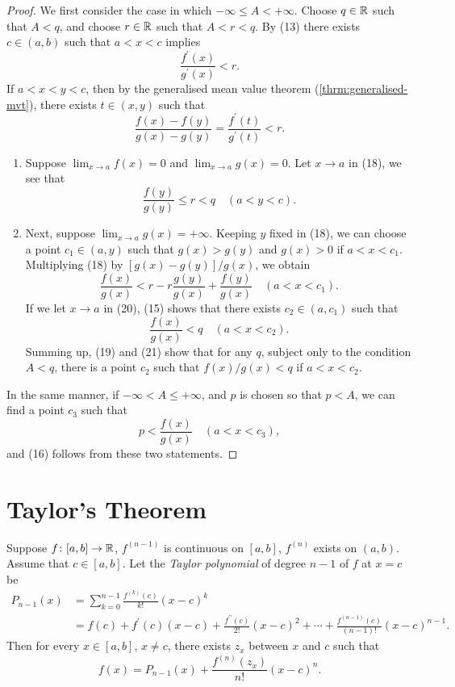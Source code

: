 \begin{proof}
We first consider the case in which $-\infty\le A<+\infty$. Choose $q\in\mathbb R$ such that $A<q$, and choose $r\in\mathbb R$ such that $A<r<q$.
By (13) there exists $c\in(a,b)$ such that $a<x<c$ implies
\[\frac{f^\prime(x)}{g^\prime(x)}<r.\]
If $a<x<y<c$, then by the generalised mean value theorem (\ref{thrm:generalised-mvt}), there exists $t\in(x,y)$ such that
\[\frac{f(x)-f(y)}{g(x)-g(y)}=\frac{f^\prime(t)}{g^\prime(t)}<r.\]
\begin{enumerate}[label=(\roman*)]
\item Suppose $\displaystyle\lim_{x\to a}f(x)=0$ and $\displaystyle\lim_{x\to a}g(x)=0$. Let $x\to a$ in (18), we see that
\[\frac{f(y)}{g(y)}\le r<q\quad(a<y<c).\]

\item Next, suppose $\displaystyle\lim_{x\to a}g(x)=+\infty$. 
Keeping $y$ fixed in (18), we can choose a point $c_1\in(a,y)$ such that $g(x)>g(y)$ and $g(x)>0$ if $a<x<c_1$. 
Multiplying (18) by $[g(x)-g(y)]/g(x)$, we obtain
\[\frac{f(x)}{g(x)}<r-r\frac{g(y)}{g(x)}+\frac{f(y)}{g(x)}\quad(a<x<c_1).\]
If we let $x\to a$ in (20), (15) shows that there exists $c_2\in(a,c_1)$ such that
\[\frac{f(x)}{g(x)}<q\quad(a<x<c_2).\]
Summing up, (19) and (21) show that for any $q$, subject only to the condition $A<q$, there is a point $c_2$ such that $f(x)/g(x)<q$ if $a<x<c_2$.
\end{enumerate}

In the same manner, if $-\infty<A\le+\infty$, and $p$ is chosen so that $p<A$, we can find a point $c_3$ such that
\[p<\frac{f(x)}{g(x)}\quad(a<x<c_3),\]
and (16) follows from these two statements.
\end{proof}
\pagebreak

\section{Taylor's Theorem}
\begin{theorem}
Suppose $f\colon [a,b]\to\mathbb R$, $f^{(n-1)}$ is continuous on $[a,b]$, $f^{(n)}$ exists on $(a,b)$. Assume that $c\in[a,b]$. Let the \emph{Taylor polynomial} of degree $n-1$ of $f$ at $x=c$ be
\begin{align*}
P_{n-1}(x)&=\sum_{k=0}^{n-1}\frac{f^{(k)}(c)}{k!}(x-c)^k\\
&=f(c)+f^\prime(c)(x-c)+\frac{f^{\prime\prime}(c)}{2!}(x-c)^2+\cdots+\frac{f^{(n-1)}(c)}{(n-1)!}(x-c)^{n-1}.
\end{align*}
Then for every $x\in[a,b]$, $x\neq c$, there exists $z_x$ between $x$ and $c$ such that
\begin{equation}\label{eqn:taylor-thrm}
f(x)=P_{n-1}(x)+\frac{f^{(n)}(z_x)}{n!}(x-c)^n.
\end{equation}
\end{theorem}

